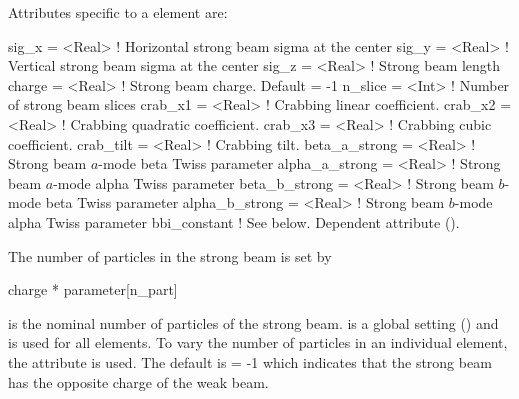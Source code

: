 Attributes specific to a  element are:
\begin{example}
  sig_x          = <Real> ! Horizontal strong beam sigma at the center 
  sig_y          = <Real> ! Vertical strong beam sigma at the center
  sig_z          = <Real> ! Strong beam length
  charge         = <Real> ! Strong beam charge. Default = -1
  n_slice        = <Int>  ! Number of strong beam slices
  crab_x1        = <Real> ! Crabbing linear coefficient.
  crab_x2        = <Real> ! Crabbing quadratic coefficient.
  crab_x3        = <Real> ! Crabbing cubic coefficient.
  crab_tilt      = <Real> ! Crabbing tilt.
  beta_a_strong  = <Real> ! Strong beam $a$-mode beta Twiss parameter
  alpha_a_strong = <Real> ! Strong beam $a$-mode alpha Twiss parameter 
  beta_b_strong  = <Real> ! Strong beam $b$-mode beta Twiss parameter
  alpha_b_strong = <Real> ! Strong beam $b$-mode alpha Twiss parameter
  bbi_constant            ! See below. Dependent attribute ().
\end{example}

The number of particles in the strong beam is set by
\begin{example}
  charge * parameter[n_part]
\end{example}
 is the nominal number of particles of the strong beam. 
is a global setting () and is used for all  elements.  To vary the number
of particles in an individual  element, the  attribute is used.  The default
is  = -1 which indicates that the strong beam has the opposite charge of the weak beam.

